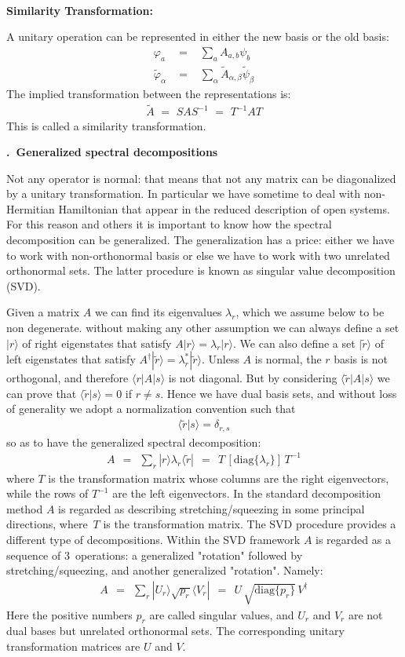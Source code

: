 \documentclass[onecolumn,fleqn, 11pt]{revtex4}
\newcommand{\beq}{\begin{eqnarray}}
\newcommand{\eeq}{\end{eqnarray}}
\renewcommand{\thesubsection}{\arabic{subsection}}
\renewcommand{\thesubsubsection}{\arabic{subsubsection}}
\newcommand{\sheadC}[1]
{
\addtocounter{subsubsection}{1}
\vspace{5mm}
{\bf \thesubsection.\thesubsubsection \ #1}  
\nopagebreak
\phantomsection
}
\begin{document}
 
\ \\
{\bf Similarity Transformation:} 

A unitary operation can be represented 
in either the new basis or the old basis:
\beq
\varphi_{a} \,\, 
&=& \,\, \sum_a A_{a,b} \psi_b 
\\ \nonumber
\tilde{\varphi}_{\alpha} \,\, 
&=& \,\, \sum_{\alpha} \tilde{A}_{\alpha,\beta} \tilde{\psi}_{\beta} 
\eeq
The implied transformation between 
the representations is:
\beq
\tilde{A} \,\, = \,\, S A S^{-1} \,\, = \,\, T^{-1} A T 
\eeq
This is called a similarity transformation. 



\sheadC{Generalized spectral decompositions}

Not any operator is normal: that means that not any matrix 
can be diagonalized by a unitary transformation. In particular 
we have sometime to deal with non-Hermitian Hamiltonian that 
appear in the reduced description of open systems. 
For this reason and others it is important to know how 
the spectral decomposition can be generalized. The generalization 
has a price: either we have to work with non-orthonormal basis 
or else we have to work with two unrelated orthonormal sets.
The latter procedure is known as singular value decomposition (SVD). 


Given a matrix $A$ we can find its eigenvalues $\lambda_r$, 
which we assume below to be non degenerate. without making any 
other assumption we can always define a set $|r\rangle$ 
of right eigenstates that satisfy ${A|r\rangle = \lambda_r |r\rangle}$.
We can also define a set $|\tilde{r}\rangle$ of left eigenstates  
that satisfy ${A^{\dag}|\tilde{r}\rangle = \lambda_r^* |\tilde{r}\rangle}$.
Unless $A$ is normal, the $r$ basis is not orthogonal, 
and therefore ${\langle r|A| s\rangle}$ 
is not diagonal. But by considering ${\langle \tilde{r}|A| s\rangle}$ 
we can prove that ${\langle \tilde{r}|s\rangle =0}$ if ${r \ne s}$.  
Hence we have dual basis sets, and without loss of generality 
we adopt a normalization convention such that 
\beq
\langle \tilde{r} | s\rangle = \delta_{r,s}
\eeq
so as to have the generalized spectral decomposition:
\beq
A \ \ = \ \ \sum_r  | r \rangle \lambda_r \langle \tilde{r} | 
\ \ = \ \ T \,\left[\mbox{diag}\{\lambda_r\}\right]\,T^{-1}
\eeq
where $T$ is the transformation matrix 
whose columns are the right eigenvectors, 
while the rows of $T^{-1}$ are the left eigenvectors. 
In the standard decomposition method $A$ 
is regarded as describing stretching/squeezing 
in some principal directions, where~$T$ 
is the transformation matrix.   
The SVD procedure provides a different 
type of decompositions. Within the SVD framework $A$ is 
regarded as a sequence of 3~operations: 
a generalized "rotation" followed by stretching/squeezing, 
and another generalized "rotation". Namely:   
\beq
A \ \ = \ \ \sum_r  |U_r\rangle \sqrt{p_r} \langle V_r| 
\ \ = \ \ U\,\sqrt{\mbox{diag}\{p_r\}}\,V^{\dagger}
\eeq
Here the positive numbers $p_r$ are called singular values, 
and $U_r$ and $V_r$ are not dual bases 
but unrelated orthonormal sets. The corresponding 
unitary transformation matrices are $U$ and $V$.
\end{document}
